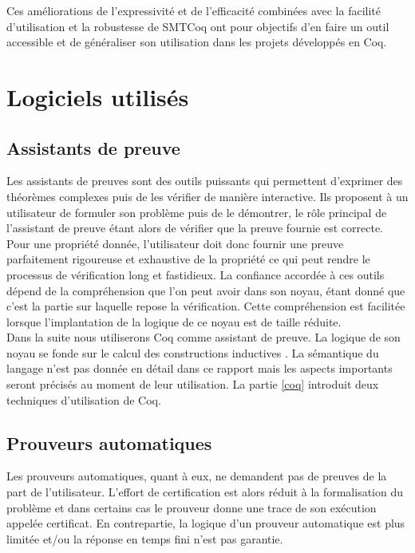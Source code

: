 \documentclass[11pt]{article}
\begin{document}
Ces améliorations de l'expressivité et de l'efficacité combinées avec la facilité d'utilisation et la robustesse de SMTCoq ont pour objectifs d'en faire un outil accessible et de généraliser son utilisation dans les projets développés en Coq.



\newpage
\section{Logiciels utilisés}

\subsection{Assistants de preuve}\label{assistants}

Les assistants de preuves sont des outils puissants qui permettent d'exprimer des théorèmes complexes puis de les vérifier de manière interactive. Ils proposent à un utilisateur de formuler son problème puis de le démontrer, le rôle principal de l'assistant de preuve étant alors de vérifier que la preuve fournie est correcte. Pour une propriété donnée, l'utilisateur doit donc fournir une preuve parfaitement rigoureuse et exhaustive de la propriété ce qui peut rendre le processus de vérification long et fastidieux. La confiance accordée à ces outils dépend de la compréhension que l'on peut avoir dans son noyau, étant donné que c'est la partie sur laquelle repose la vérification. Cette compréhension est facilitée lorsque l'implantation de la logique de ce noyau est de taille réduite. \\

Dans la suite nous utiliserons Coq comme assistant de preuve. La logique de son noyau se fonde sur le calcul des constructions inductives \cite{coq_intro}. La sémantique du langage n'est pas donnée en détail dans ce rapport mais les aspects importants seront précisés au moment de leur utilisation. La partie \ref{coq} introduit deux techniques d'utilisation de Coq. 

\subsection{Prouveurs automatiques}\label{prouveurs}

Les prouveurs automatiques, quant à eux, ne demandent pas de preuves de la part de l'utilisateur. L'effort de certification est alors réduit à la formalisation du problème et dans certains cas le prouveur donne une trace de son exécution appelée certificat. En contrepartie, la logique d'un prouveur automatique est plus limitée et/ou la réponse en temps fini n'est pas garantie.\\
\end{document}
